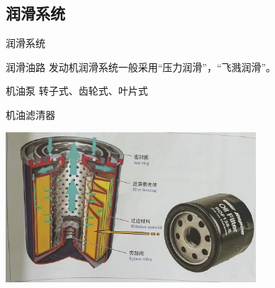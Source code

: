 \subsection{润滑系统}
\begin{frame}{润滑系统}
	\begin{block}{润滑油路}
		发动机润滑系统一般采用“压力润滑”，“飞溅润滑”。
	\end{block}
		\begin{block}{机油泵}
		转子式、齿轮式、叶片式
	\end{block}
\end{frame}
\begin{frame}
	\begin{block}{机油滤清器}
		\begin{center}
			\includegraphics[width=0.7\textwidth]{2-37}
		\end{center}
	\end{block}
\end{frame}
